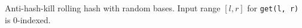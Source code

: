 
Anti-hash-kill rolling hash with random bases. Input range $[l, r]$ for \lstinline|get(l, r)| is 0-indexed.


